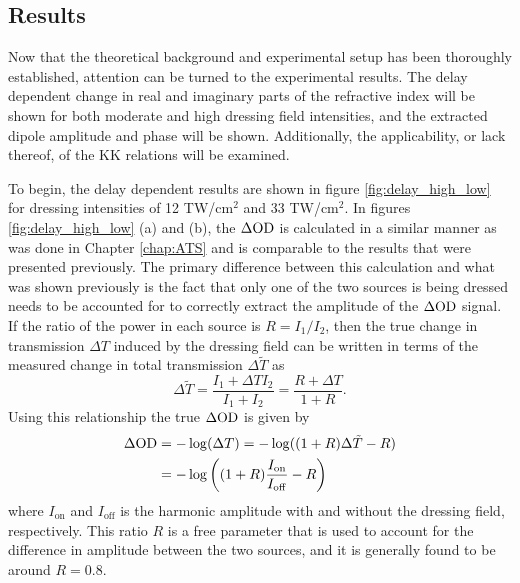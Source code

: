 \subsection{Results}
\label{sec:CATS_ar_results}

Now that the theoretical background and experimental setup has been thoroughly established, attention can be turned to the experimental results.  The delay dependent change in real and imaginary parts of the refractive index will be shown for both moderate and high dressing field intensities, and the extracted dipole amplitude and phase will be shown. Additionally, the applicability, or lack thereof, of the KK relations will be examined.

To begin, the delay dependent results are shown in figure \ref{fig:delay_high_low} for dressing intensities of 12 TW/cm$^2$ and 33 TW/cm$^2$. In figures \ref{fig:delay_high_low} (a) and (b), the $\Delta\mathrm{OD}$ is calculated in a similar manner as was done in Chapter \ref{chap:ATS}  and is comparable to the results that were presented previously. The primary difference between this calculation and what was shown previously is the fact that only one of the two sources is being dressed needs to be accounted for to correctly extract the amplitude of the $\Delta\mathrm{OD}$ signal.  If the ratio of the power in each source is $R=I_1/I_2$, then the true change in transmission $\Delta T$ induced by the dressing field can be written in terms of the measured change in total transmission $\Delta \tilde{T}$ as
\begin{equation}
	\label{eqn:dod_fringe_shift}
	\Delta \tilde{T} = \frac{I_1 + \Delta T I_2}{I_1 + I_2} = \frac{R + \Delta T}{1+ R}.
\end{equation}
Using this relationship the true $\Delta\mathrm{OD}$ is given by 
\begin{equation}
	\label{eqn:dod_R}
	\begin{aligned}
		\Delta\mathrm{OD} & = -\log(\Delta T) = -\log((1+R)\Delta \tilde{T} - R) \\
		&= -\log\bigg((1+R)\frac{I_{\mathrm{on}}}{I_{\mathrm{off}}} - R\bigg)
	\end{aligned}
\end{equation}
where $I_{\mathrm{on}}$ and $I_{\mathrm{off}}$ is the harmonic amplitude with and without the dressing field, respectively.  This ratio $R$ is a free parameter that is used to account for the difference in amplitude between the two sources, and it is generally found to be around $R=0.8$.
